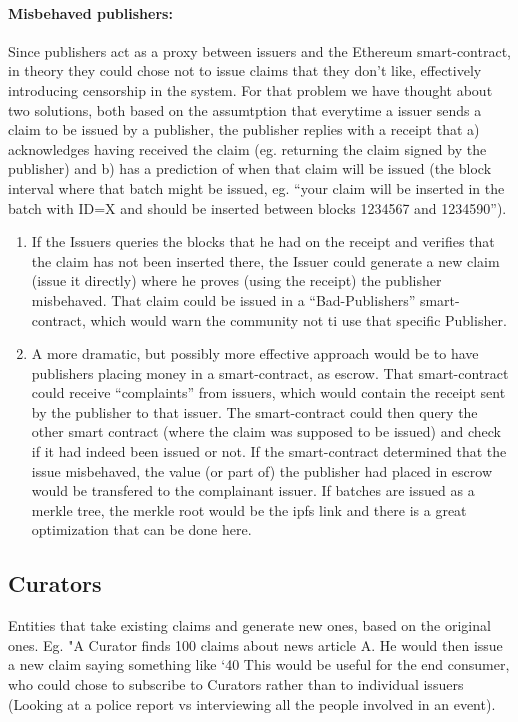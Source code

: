 \paragraph{Misbehaved publishers: } Since publishers act as a proxy between issuers and the Ethereum smart-contract, in theory they could chose not to issue claims that they don’t like, effectively introducing censorship in the system. For that problem we have thought about two solutions, both based on the assumtption that everytime a issuer sends a claim to be issued by a publisher, the publisher replies with a receipt that a) acknowledges having received the claim (eg. returning the claim signed by the publisher) and b) has a prediction of when that claim will be issued (the block interval where that batch might be issued, eg. “your claim will be inserted in the batch with ID=X and should be inserted between blocks 1234567 and 1234590”).

\begin{enumerate}
    \item If the Issuers queries the blocks that he had on the receipt and verifies that the claim has not been inserted there, the Issuer could generate a new claim (issue it directly) where he proves (using the receipt) the publisher misbehaved. That claim could be issued in a “Bad-Publishers” smart-contract, which would warn the community not ti use that specific Publisher.
    \item A more dramatic, but possibly more effective approach would be to have publishers placing money in a smart-contract, as escrow. That smart-contract could receive “complaints” from issuers, which would contain the receipt sent by the publisher to that issuer. The smart-contract could then query the other smart contract (where the claim was supposed to be issued) and check if it had indeed been issued or not. If the smart-contract determined that the issue misbehaved, the value (or part of) the publisher had placed in escrow would be transfered to the complainant issuer. If batches are issued as a merkle tree, the merkle root would be the ipfs link and there is a great optimization that can be done here.
\end{enumerate}

\subsection{Curators}
Entities that take existing claims and generate new ones, based on the original ones.
Eg. "A Curator finds 100 claims about news article A. He would then issue a new claim saying something like ‘40%
This would be useful for the end consumer, who could chose to subscribe to Curators rather than to individual issuers (Looking at a police report vs interviewing all the people involved in an event).

